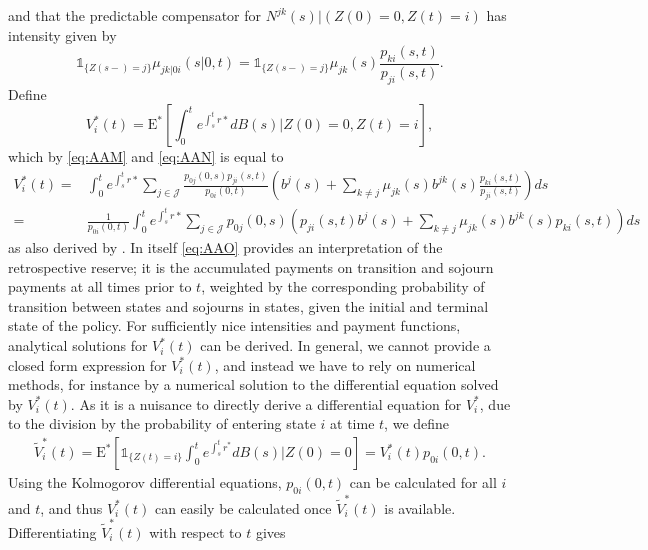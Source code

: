 \documentclass[12pt]{article}
\newcommand{\E}{\text{E}}
\newcommand{\indic}[1]{\mathds{1}_{ \{ #1 \} }}
\theoremstyle{my_thm}
\begin{document}
and that the predictable compensator for $N^{jk}(s)| (Z(0)=0, Z(t)=i )$ has intensity given by
\begin{equation}
\indic{Z(s-)=j}\mu_{jk|0i}(s|0,t)=\indic{Z(s-)=j}\mu_{jk}(s)\frac{p_{ki}(s,t)}{p_{ji}(s,t)}. \label{eq:AAN}
\end{equation}
Define
$$
V_i^*(t)= \E^* \left[ \int_0^t e^{\int_s^t r*} dB(s) \big|Z(0)=0, Z(t)=i \right],
$$
which by \eqref{eq:AAM} and \eqref{eq:AAN} is equal to
\begin{align}
V_i^*(t)=& \int_0^t e^{\int_s^t r*} \sum_{j \in \mathcal{J}} \frac{p_{0j}(0,s)p_{ji}(s,t)}{p_{0i}(0,t)} \left(  b^{j}(s) + \sum_{k \neq j}  \mu_{jk}(s) b^{jk}(s)\frac{p_{ki}(s,t)}{p_{ji}(s,t)} \right) ds
 \nonumber \\
=&
 \frac{1}{p_{0i}(0,t)}\int_0^t e^{\int_s^t r*} \sum_{j \in \mathcal{J}} p_{0j}(0,s) \left(p_{ji}(s,t)   b^{j}(s) + \sum_{k \neq j}  \mu_{jk}(s) b^{jk}(s) p_{ki}(s,t) \right) ds \label{eq:AAO}
\end{align}
as also derived by \citet{Norberg}. In itself \eqref{eq:AAO} provides an interpretation of the retrospective reserve; it is the accumulated payments on transition and sojourn payments at all times prior to $t$, weighted by the corresponding probability of transition between states and sojourns in states, given the initial and terminal state of the policy. For sufficiently nice intensities and payment functions, analytical solutions for $V_i^*(t)$ can be derived. In general, we cannot provide a closed form expression for $V_i^*(t)$, and instead we have to rely on numerical methods, for instance by a numerical solution to the differential equation solved by $V_i^*(t)$. As it is a nuisance to directly derive a differential equation for $V_i^*$, due to the division by the probability of entering state $i$ at time $t$, we define
\begin{align*}
\tilde{V}_i^*(t)= \E^* \left[ \indic{Z(t)=i} \int_0^t e^{\int_s^t r^*} dB(s) \big|Z(0)=0\right] = V_i^*(t)p_{0i}(0,t).
\end{align*}
Using the Kolmogorov differential equations, $p_{0i}(0,t)$ can be calculated for all $i$ and $t$, and thus $V_i^*(t)$ can easily be calculated once $\tilde{V}_i^*(t)$ is available. Differentiating $\tilde{V}_i^*(t)$ with respect to $t$ gives
\end{document}
